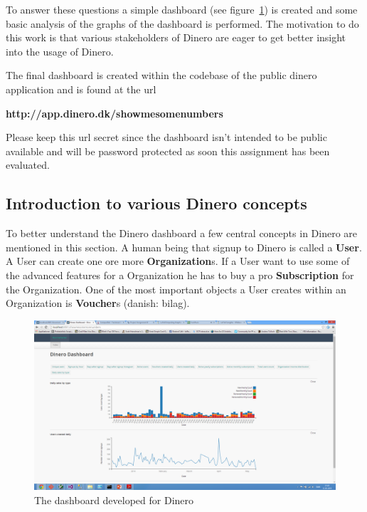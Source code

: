 \documentclass{acm_proc_article-sp}
\begin{document}
To answer these questions a simple dashboard (see figure~\ref{fig:dashboard}) is created and some basic analysis of the graphs of the dashboard is performed. The motivation to do this work is that various stakeholders of Dinero are eager to get better insight into the usage of Dinero. 

The final dashboard is created within the codebase of the public dinero application and is found at the url 

\textbf{http://app.dinero.dk/showmesomenumbers}

Please keep this url secret since the dashboard isn't intended to be public available and will be password protected as soon this assignment has been evaluated. 

\subsection{Introduction to various Dinero concepts}

To better understand the Dinero dashboard a few central concepts in Dinero are mentioned in this section. A human being that signup to Dinero is called a \textbf{User}. A User can create one ore more \textbf{Organization}s. If a User want to use some of the advanced features for a Organization he has to buy a pro \textbf{Subscription} for the Organization. One of the most important objects a User creates within an Organization is \textbf{Voucher}s (danish: bilag).

\begin{figure}
    \centering
    \includegraphics[width=\columnwidth]{dinero-dashboard.png}
    \caption{The dashboard developed for Dinero}
    \label{fig:dashboard}
\end{figure}
\end{document}
